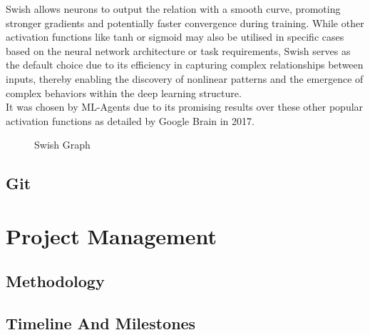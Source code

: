 \documentclass{article}
\begin{document}
Swish allows neurons to output the relation with a smooth curve, promoting stronger gradients and potentially faster convergence during training. While other activation functions like tanh or sigmoid may also be utilised in specific cases based on the neural network architecture or task requirements, Swish serves as the default choice due to its efficiency in capturing complex relationships between inputs, thereby enabling the discovery of nonlinear patterns and the emergence of complex behaviors within the deep learning structure.\\

It was chosen by ML-Agents due to its promising results over these other popular activation functions as detailed by Google Brain in 2017.

\begin{figure}[h]
    \centering
    \caption{Swish Graph}
\end{figure}

\subsection{Git}
\lipsum[2][1]

\section{Project Management}

\subsection{Methodology}
\lipsum[2][1]

\subsection{Timeline And Milestones}
\lipsum[2][1]
\end{document}
